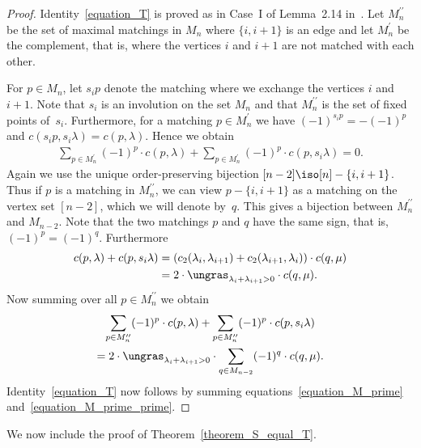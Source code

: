 \begin{proof}
Identity~\eqref{equation_T} 
is proved as in Case~I of Lemma~2.14 in~\cite{Herb}.
Let $M_{n}^{\prime\prime}$ be the set
of maximal matchings in $M_{n}$ where
$\{i,i+1\}$ is an edge and
let $M_{n}^{\prime}$ be the complement,
that is, where the vertices $i$ and $i+1$ are not matched with each other.

For $p \in M_{n}$, let $s_{i}p$ denote the
matching where we exchange the vertices $i$ and~$i+1$.
Note that $s_{i}$ is an involution on the
set $M_{n}$
and that $M_{n}^{\prime\prime}$ is the set of fixed points
of~$s_{i}$.
Furthermore, for a matching $p \in M_{n}^{\prime}$
we have
$(-1)^{s_{i} p} = - (-1)^{p}$
and
$c(s_{i}p, s_{i} \lambda) = c(p, \lambda)$.
Hence we obtain
\begin{align}
\sum_{p \in M_{n}^{\prime}} (-1)^{p} \cdot c(p, \lambda)
+
\sum_{p \in M_{n}^{\prime}} (-1)^{p} \cdot c(p, s_{i} \lambda)
= 0 .
\label{equation_M_prime}
\end{align}
Again we use
the unique order-preserving bijection $[n-2] \iso [n] - \{i,i+1\}$.
Thus if $p$ is a matching in $M_{n}^{\prime\prime}$, we can view
$p-\{i,i+1\}$ as a matching
on the vertex set $[n-2]$, which we will denote by~$q$.
This gives a bijection between
$M_{n}^{\prime\prime}$
and $M_{n-2}$.
Note that the two matchings $p$ and $q$ have the same sign,
that is, $(-1)^{p} = (-1)^{q}$.
Furthermore
\begin{align*}
c(p,\lambda) + c(p,s_{i}\lambda) 
& =
(c_{2}(\lambda_{i},\lambda_{i+1}) + c_{2}(\lambda_{i+1},\lambda_{i}))
\cdot
c(q,\mu) \\
& =
2 \cdot \ungras_{\lambda_{i}+\lambda_{i+1} > 0}
\cdot
c(q,\mu) .
\end{align*}
Now summing over all $p \in M_{n}^{\prime\prime}$
we obtain
\begin{multline}
\label{equation_M_prime_prime}
\sum_{p \in M_{n}^{\prime\prime}}
(-1)^{p} \cdot c(p, \lambda)
+
\sum_{p \in M_{n}^{\prime\prime}}
(-1)^{p} \cdot c(p, s_{i} \lambda)
\\ = 
2 \cdot \ungras_{\lambda_{i}+\lambda_{i+1} > 0} 
\cdot
\sum_{q \in M_{n-2}} (-1)^{q} \cdot c(q, \mu) .
\end{multline}
Identity~\eqref{equation_T} 
now follows by summing equations~\eqref{equation_M_prime}
and~\eqref{equation_M_prime_prime}.
\end{proof}


We now include the proof of Theorem~\ref{theorem_S_equal_T}. 

